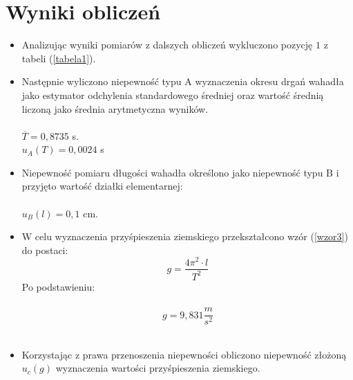\documentclass{article}
\begin{document}

\section{Wyniki obliczeń}
 \begin{itemize}
	\item Analizując wyniki pomiarów z dalszych obliczeń wykluczono pozycję $1$ z tabeli (\ref{tabela1}).
		
	\item Następnie wyliczono niepewność typu A wyznaczenia okresu drgań wahadła jako estymator odchylenia standardowego średniej oraz wartość
	średnią liczoną jako średnia arytmetyczna wyników.\\\\
	 $\overline{T} = 0,8735$ s.\\ %
	 $u_A(T) = 0,0024$ s
	

	\item Niepewność pomiaru długości wahadła określono jako niepewność typu B i przyjęto wartość działki elementarnej: \\\\ %
		$u_B(l) = 0,1$ cm.\\ %
		
	\item W celu wyznaczenia przyśpieszenia ziemskiego przekształcono wzór (\ref{wzor3}) do postaci:
		\begin{equation}
			g = \frac{4\pi^2\cdot l}{T^2}
		\end{equation}
		Po podstawieniu:\\\\
		\[ g = 9,831 \frac{m}{s^2} \]\\
		 
		
	\item Korzystając z prawa przenoszenia niepewności obliczono niepewność złożoną $u_c(g)$ wyznaczenia wartości przyśpieszenia ziemskiego.
		

\end{itemize}
\end{document}
